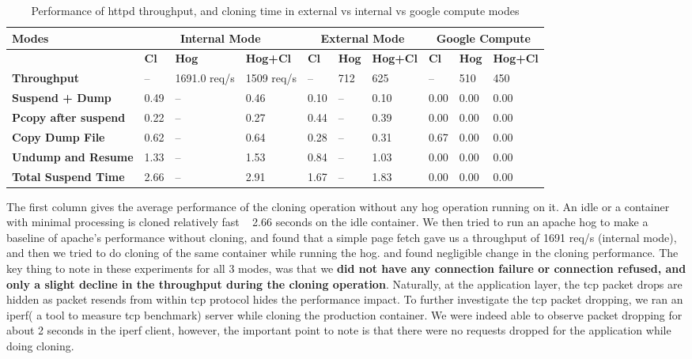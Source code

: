 \begin{table}[ht]
  \centering
    \begin{tabular}{ | p{4cm} | l | l | l | l | l | l | l | l | l |}
    \hline
    \textbf{Modes} & \multicolumn{3}{|c|}{\textbf{Internal Mode}} & \multicolumn{3}{|c|}{\textbf{External Mode}} & \multicolumn{3}{|c|}{\textbf{Google Compute}}\\\hline
    \textbf{ } & \textbf{Cl} & \textbf{Hog} & \textbf{Hog+Cl} & \textbf{Cl} & \textbf{Hog} & \textbf{Hog+Cl} & \textbf{Cl} & \textbf{Hog} & \textbf{Hog+Cl} \\ \hline
    \hline
    \textbf{Throughput} & -- & 1691.0 req/s & 1509 req/s & -- & 712 & 625 & -- & 510 & 450\\ \hline
    \hline
    \textbf{Suspend + Dump} & 0.49 & -- & 0.46 & 0.10 & -- & 0.10 & 0.00 & 0.00 & 0.00\\ \hline
    \textbf{Pcopy after suspend} & 0.22 & -- & 0.27 & 0.44 & -- & 0.39 & 0.00 & 0.00 & 0.00\\ \hline
    \textbf{Copy Dump File} & 0.62 &  -- & 0.64 & 0.28 & -- & 0.31 & 0.67 & 0.00 & 0.00\\ \hline
    \textbf{Undump and Resume} & 1.33 &  -- & 1.53 & 0.84 & -- & 1.03 & 0.00 & 0.00 & 0.00\\ \hline 
    \hline
    \textbf{Total Suspend Time} & 2.66 &  -- & 2.91 & 1.67 & -- & 1.83 & 0.00 & 0.00 & 0.00\\ \hline
    \end{tabular}
    \captionsetup{justification=centering}
	\caption{Performance of httpd throughput, and cloning time in external vs internal vs google compute modes}
	\label{table:clonePerf}
\end{table}
\fi


\iffalse
The first column gives the average performance of the cloning operation without any hog operation running on it.  
An idle or a container with minimal processing is cloned relatively fast ~ 2.66 seconds on the idle container. 
We then tried to run an apache hog to make a baseline of apache's performance without cloning, and found that a simple page fetch gave us a throughput of 1691 req/s (internal mode), and then we tried to do cloning of the same container while running the hog. and found negligible change in the cloning performance.
The key thing to note in these experiments for all 3 modes, was that we \textbf{did not have any connection failure or connection refused, and only a slight decline in the throughput during the cloning operation}. 
Naturally, at the application layer, the tcp packet drops are hidden as packet resends from within tcp protocol hides the performance impact.
To further investigate the tcp packet dropping, we ran an iperf\cite{iperf}( a tool to measure tcp benchmark) server while cloning the production container. 
We were indeed able to observe packet dropping for about 2 seconds in the iperf client, however, the important point to note is that there were no requests dropped for the application while doing cloning. 


